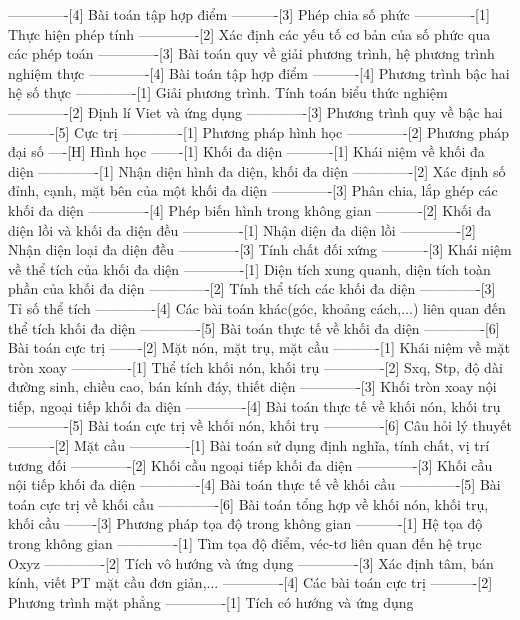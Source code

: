 -------------[4] Bài toán tập hợp điểm
----------[3] Phép chia số phức
-------------[1] Thực hiện phép tính
-------------[2] Xác định các yếu tố cơ bản của số phức qua các phép toán
-------------[3] Bài toán quy về giải phương trình, hệ phương trình nghiệm thực
-------------[4] Bài toán tập hợp điểm
----------[4] Phương trình bậc hai hệ số thực
-------------[1] Giải phương trình. Tính toán biểu thức nghiệm
-------------[2] Định lí Viet và ứng dụng
-------------[3] Phương trình quy về bậc hai
----------[5] Cực trị
-------------[1] Phương pháp hình học
-------------[2] Phương pháp đại số
----[H] Hình học
-------[1] Khối đa diện
----------[1] Khái niệm về khối đa diện
-------------[1] Nhận diện hình đa diện, khối đa diện
-------------[2] Xác định số đỉnh, cạnh, mặt bên của một khối đa diện
-------------[3] Phân chia, lắp ghép các khối đa diện
-------------[4] Phép biến hình trong không gian
----------[2] Khối đa diện lồi và khối đa diện đều
-------------[1] Nhận diện đa diện lồi
-------------[2] Nhận diện loại đa diện đều
-------------[3] Tính chất đối xứng
----------[3] Khái niệm về thể tích của khối đa diện
-------------[1] Diện tích xung quanh, diện tích toàn phần của khối đa diện
-------------[2] Tính thể tích các khối đa diện
-------------[3] Tỉ số thể tích
-------------[4] Các bài toán khác(góc, khoảng cách,...) liên quan đến thể tích khối đa diện
-------------[5] Bài toán thực tế về khối đa diện
-------------[6] Bài toán cực trị
-------[2] Mặt nón, mặt trụ, mặt cầu
----------[1] Khái niệm về mặt tròn xoay
-------------[1] Thể tích khối nón, khối trụ
-------------[2] Sxq, Stp, độ dài đường sinh, chiều cao, bán kính đáy, thiết diện
-------------[3] Khối tròn xoay nội tiếp, ngoại tiếp khối đa diện
-------------[4] Bài toán thực tế về khối nón, khối trụ
-------------[5] Bài toán cực trị về khối nón, khối trụ
-------------[6] Câu hỏi lý thuyết
----------[2] Mặt cầu
-------------[1] Bài toán sử dụng định nghĩa, tính chất, vị trí tương đối
-------------[2] Khối cầu ngoại tiếp khối đa diện
-------------[3] Khối cầu nội tiếp khối đa diện
-------------[4] Bài toán thực tế về khối cầu
-------------[5] Bài toán cực trị về khối cầu
-------------[6] Bài toán tổng hợp về khối nón, khối trụ, khối cầu
-------[3] Phương pháp tọa độ trong không gian
----------[1] Hệ tọa độ trong không gian
-------------[1] Tìm tọa độ điểm, véc-tơ liên quan đến hệ trục Oxyz
-------------[2] Tích vô hướng và ứng dụng
-------------[3] Xác định tâm, bán kính, viết PT mặt cầu đơn giản,...
-------------[4] Các bài toán cực trị
----------[2] Phương trình mặt phẳng
-------------[1] Tích có hướng và ứng dụng
